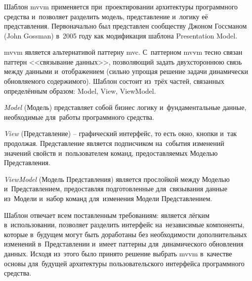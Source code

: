\subsubsection {}
\label{sec:analysis:research:mobArch:mvvm}

Шаблон \gls{mvvm} применяется при~проектировании архитектуры программного средства и~позволяет разделить модель, представление и~логику её представления. Первоначально был представлен сообществу Джоном Госсманом (John Gossman) в~2005 году как модификация шаблона Presentation Model\cite{wiki:mvvm}.

\gls{mvvm} является альтернативой паттерну \gls{mvc}. С~паттерном \gls{mvvm} тесно связан паттерн <<связывание данных>>, позволяющий задать двухстороннюю связь между данными и~отображением (сильно упрощая решение задачи динамически обновляемого содержимого). Шаблон состоит из~трёх частей, связанных определённым образом: Model, View, ViewModel.

\emph{Model} (Модель) представляет собой бизнес логику и~фундаментальные данные, необходимые для~работы программного средства.

\emph{View} (Представление) -- графический интерфейс, то есть окно, кнопки и~так продолжая. Представление является подписчиком на~события изменений значений свойств и~пользователем команд, предоставляемых Моделью Представления.

\emph{ViewModel} (Модель Представления) является прослойкой между Моделью и~Представлением, предоставляя подготовленные для~связывания данные из~Модели и~набор команд для~изменения Модели Представлением.

Шаблон отвечает всем поставленным требованиям: является лёгким в~использовании, позволяет разделить интерфейс на~независимые компоненты, которые в~будущем могут быть доработаны без необходимости дополнительных изменений в~Представлении и~имеет паттерны для~динамического обновления данных\cite{app-architecture}. Исходя из~этого было принято решение выбрать \gls{mvvm} в~качестве основы для~будущей архитектуры пользовательского интерфейса программного средства.
